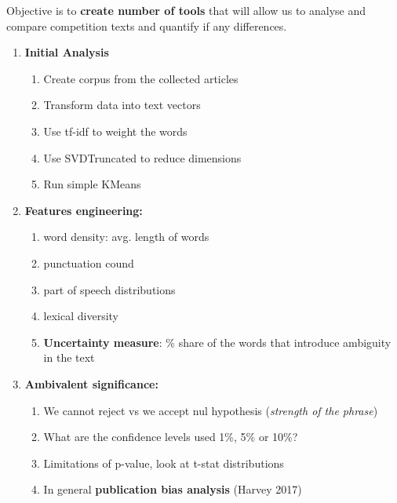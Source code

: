 \documentclass{article}
\begin{document}
Objective is to \textbf{create number of tools} that will allow us to analyse and compare competition texts and quantify if any differences. \\
\begin{enumerate}
    \item \textbf{Initial Analysis}
        \begin{enumerate}
            \item Create corpus from the collected articles
            \item Transform data into text vectors
            \item Use tf-idf to weight the words
            \item Use SVDTruncated to reduce dimensions
            \item Run simple KMeans
        \end{enumerate}

    \item \textbf{Features engineering:}
        \begin{enumerate}
            \item word density: avg. length of words
            \item punctuation cound
            \item part of speech distributions
            \item lexical diversity
            \item \textbf{Uncertainty measure}: \% share of the words that introduce ambiguity in the text
        \end{enumerate}

    \item \textbf{Ambivalent significance:}

        \begin{enumerate}
            \item We cannot reject vs we accept nul hypothesis (\textit{strength of the phrase})
            \item What are the confidence levels used 1\%, 5\% or 10\%?
            \item Limitations of p-value, look at t-stat distributions
            \item In general \textbf{publication bias analysis} (Harvey 2017)
        \end{enumerate}

\end{enumerate}
\newpage
\end{document}
